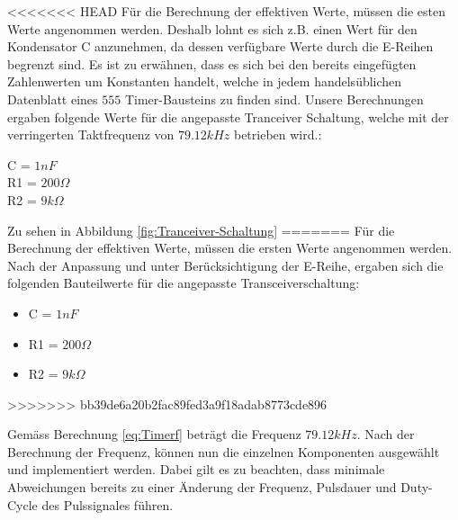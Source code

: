 <<<<<<< HEAD
Für die Berechnung der effektiven Werte, müssen die esten Werte angenommen werden. Deshalb lohnt es sich z.B. einen Wert für den Kondensator C anzunehmen, da dessen verfügbare Werte  durch die E-Reihen begrenzt sind. Es ist zu erwähnen, dass es sich bei den bereits eingefügten Zahlenwerten um Konstanten handelt, welche in jedem handelsüblichen Datenblatt eines $555$ Timer-Bausteins zu finden sind. Unsere Berechnungen ergaben folgende Werte für die angepasste Tranceiver Schaltung, welche mit der verringerten Taktfrequenz von $79.12 kHz$ betrieben wird.:

\begin{center}
C = $1nF$\\
R1 = $200\Omega$\\
R2 = $9k\Omega$\\
\end{center}

Zu sehen in Abbildung \ref{fig:Tranceiver-Schaltung}
=======
Für die Berechnung der effektiven Werte, müssen die ersten Werte angenommen werden. Nach der Anpassung und unter Berücksichtigung der E-Reihe, ergaben sich die folgenden Bauteilwerte für die angepasste Transceiverschaltung:

\begin{itemize}
\item C = $1nF$
\item R1 = $200\Omega$
\item R2 = $9k\Omega$
\end{itemize}
>>>>>>> bb39de6a20b2fac89fed3a9f18adab8773cde896
 
Gemäss Berechnung \ref{eq:Timerf} beträgt die Frequenz $79.12kHz$. Nach der Berechnung der Frequenz, können nun die einzelnen Komponenten ausgewählt und implementiert werden. Dabei gilt es zu beachten, dass minimale Abweichungen bereits zu einer Änderung der Frequenz, Pulsdauer und Duty-Cycle des Pulssignales führen.

